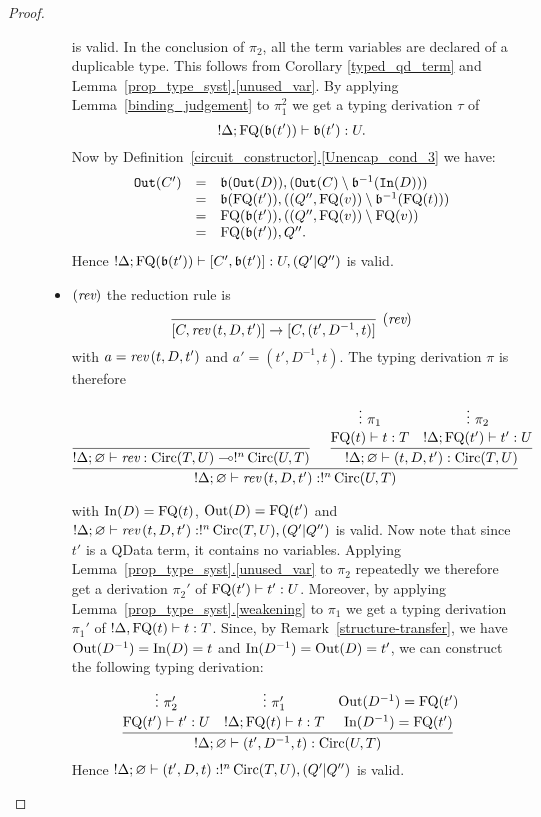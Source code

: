 \documentclass[twoside]{article}
\begin{document}
\begin{proof}
\begin{description}
\begin{itemize}
\[  \] 
  is valid. In the conclusion of $\pi_2$, all the 
  term variables are declared of a duplicable type. This 
  follows from Corollary \ref{typed_qd_term} and 
  Lemma~\hyperref[unused_var]{\ref*{prop_type_syst}.\ref*{unused_var}}. 
  By applying Lemma~\hyperref[binding_judgement]{\ref*{binding_judgement}} 
  to $\pi_1^2$ we get a typing derivation $\tau$ of 
  \[
  !\Delta;\mathop{\textrm{FQ}}\nolimits(\mathfrak{b}(t'))\vdash \mathfrak{b}(t'):U.
  \]
  Now by 
  Definition~\hyperref[Unencap_cond_3]{\ref*{circuit_constructor}.\ref*{Unencap_cond_3}} 
  we have:
  \[
  \begin{array}{rcl}
  \mathtt{Out}(C') & = & \mathfrak{b}(\mathtt{Out}(D)), (\mathtt{Out}(C)\setminus\mathfrak{b}^{-1}(\mathtt{In}(D))) \\
                   & = & \mathfrak{b}(\mathop{\textrm{FQ}}\nolimits(t')) , ((Q'',\mathop{\textrm{FQ}}\nolimits(v))\setminus \mathfrak{b}^{-1}(\mathop{\textrm{FQ}}\nolimits(t))) \\
                   & = & \mathop{\textrm{FQ}}\nolimits(\mathfrak{b}(t')) , ((Q'',\mathop{\textrm{FQ}}\nolimits(v))\setminus \mathop{\textrm{FQ}}\nolimits(v)) \\
                   & = & \mathop{\textrm{FQ}}\nolimits(\mathfrak{b}(t')),Q''.                   
  \end{array}
  \]
  Hence $!\Delta; \mathop{\textrm{FQ}}\nolimits(\mathfrak{b}(t'))\vdash [C',\mathfrak{b}(t')] :U,(Q'|Q'')$  is valid.
  \item $(\mathop{\textit{rev}}\nolimits)$ the reduction rule is
  \[
    \infer[(\rev)]{[C,\rev\,(t,D,t')]\to [C,(t',D^{-1},t)]}{}
  \]
  with $a=\mathop{\textit{rev}}\nolimits\,(t,D,t')$ and $a'=(t',D^{-1},t)$. The typing derivation $\pi$ 
  is therefore
  \begin{footnotesize}
  \[
  \infer[]{!\Delta;\varnothing\entails \rev\,(t,D,t'):!^n\Circ(U,T)}{
    \infer[]{!\Delta;\varnothing \entails \rev:\Circ(T,U)\loli !^n\Circ(U,T)}{
    }   
    &
    \infer[]{!\Delta ;\varnothing\entails (t,D,t'):\Circ(T,U)}{
      \deduce[]{\FQ(t)\entails t:T}{
        \vdots ~\pi_1
      }
      &
      \deduce[]{!\Delta;\FQ(t')\entails t':U}{
        \vdots ~\pi_2     
      }
    }
  }
  \]
  \end{footnotesize}  
  with $\mathop{\textrm{In}}\nolimits(D)=\mathop{\textrm{FQ}}\nolimits(t)$, $\mathop{\textrm{Out}}\nolimits(D)=\mathop{\textrm{FQ}}\nolimits(t')$ and 
  $!\Delta;\varnothing\vdash \mathop{\textit{rev}}\nolimits\,(t,D,t'):!^n\mathop{\textrm{Circ}}\nolimits(T,U),(Q'|Q'')$ is 
  valid. Now note that since $t'$ is a QData term, it contains no variables. 
  Applying Lemma~\hyperref[unused_var]{\ref*{prop_type_syst}.\ref*{unused_var}} 
  to $\pi_2$ repeatedly we therefore get a derivation $\pi_2'$ of 
  $\mathop{\textrm{FQ}}\nolimits(t')\vdash t':U$. Moreover, by applying
  Lemma~\hyperref[weakening]{\ref*{prop_type_syst}.\ref*{weakening}} to $\pi_1$ 
  we get a typing derivation $\pi_1'$ of $!\Delta ,\mathop{\textrm{FQ}}\nolimits(t)\vdash t:T$.
  Since, by 
  Remark~\hyperref[structure-transfer]{\ref*{structure-transfer}}, 
  we have $\mathop{\textrm{Out}}\nolimits(D^{-1})=\mathop{\textrm{In}}\nolimits(D)=t$ and $\mathop{\textrm{In}}\nolimits(D^{-1})=\mathop{\textrm{Out}}\nolimits(D)=t'$, we can construct 
  the following typing derivation:
  \[
  \infer[]{!\Delta ;\varnothing\entails (t',D^{-1},t):\Circ(U,T)}{
    \deduce[]{\FQ(t')\entails t':U}{
      \vdots ~\pi_2'
    }
    &
    \deduce[]{!\Delta;\FQ(t)\entails t:T}{
      \vdots ~\pi_1'     
    }
    &
    \deduce[]{\In(D^{-1})=\FQ(t')}{
      \Out(D^{-1})=\FQ(t')
    }
  }  
  \]
  Hence $!\Delta;\varnothing\vdash (t',D,t):!^n\mathop{\textrm{Circ}}\nolimits(T,U),(Q'|Q'')$ 
  is valid.    
\end{itemize}
\end{description}
\end{proof}
\end{document}
